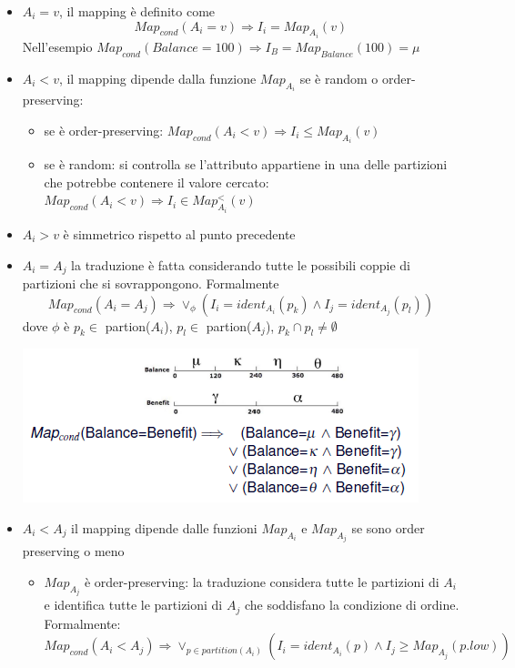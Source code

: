 \begin{itemize}
    \item \textbf{\(A_i = v\)}, il mapping è definito come \[ Map_{cond}(A_i = v) \Longrightarrow I_i = Map_{A_i}(v) \]
    Nell'esempio \( Map_{cond}(Balance = 100) \Longrightarrow I_B = Map_{Balance}(100) = \mu \)
    \item \textbf{\(A_i < v\)}, il mapping dipende dalla funzione \(Map_{A_i}\) se è random o order-preserving:
    \begin{itemize}
        \item se è order-preserving: \(Map_{cond}(A_i < v) \Longrightarrow I_i \leq Map_{A_i}(v) \)
        \item se è random: si controlla se l'attributo appartiene in una delle partizioni che potrebbe contenere il valore cercato:\\ \(Map_{cond}(A_i < v) \Longrightarrow I_i \in Map_{A_i}^<(v) \)
    \end{itemize}
    \item \textbf{\(A_i > v\)} è simmetrico rispetto al punto precedente
    \item \textbf{\(A_i = A_j\)} la traduzione è fatta considerando tutte le possibili coppie di partizioni che si sovrappongono. Formalmente
    \[Map_{cond}(A_i = A_j) \Longrightarrow \lor_\phi(I_i = ident_{A_i}(p_k) \land I_j = ident_{A_j}(p_l)) \]
    dove \(\phi\) è \(p_k \in\) partion(\(A_i\)), \(p_l \in\) partion(\(A_j\)), \(p_k \cap p_l \neq \emptyset\)
    \begin{center}
        \includegraphics[scale=0.7]{img/mapcond.png}
    \end{center}
    \item \textbf{\(A_i < A_j\)} il mapping dipende dalle funzioni \(Map_{A_i}\) e \(Map_{A_j}\) se sono order preserving o meno
    \begin{itemize}
        \item \(Map_{A_j}\) è order-preserving: la traduzione considera tutte le partizioni di \(A_i\) e identifica tutte le partizioni di \(A_j\) che soddisfano la condizione di ordine. Formalmente:
        \[ Map_{cond}(A_i < A_j) \Longrightarrow \lor_{p \in partition(A_i)} (I_i=ident_{A_i}(p) \land I_j \geq Map_{A_j}(p.low)) \]
        

\end{itemize}
\end{itemize}
